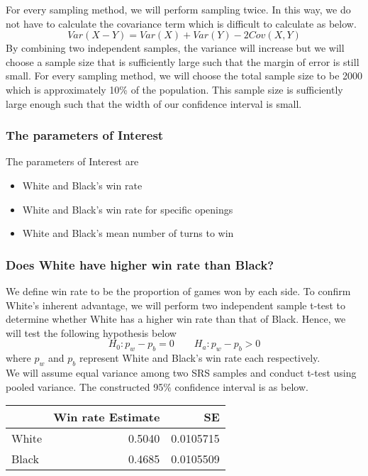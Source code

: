 \documentclass[11pt,]{article}
\begin{document}
\pagebreak

For every sampling method, we will perform sampling twice. In this way,
we do not have to calculate the covariance term which is difficult to
calculate as below. \[Var(X-Y) = Var(X)+Var(Y)-2Cov(X,Y)\] By combining
two independent samples, the variance will increase but we will choose a
sample size that is sufficiently large such that the margin of error is
still small. For every sampling method, we will choose the total sample
size to be 2000 which is approximately 10\% of the population. This
sample size is sufficiently large enough such that the width of our
confidence interval is small.

\hypertarget{the-parameters-of-interest}{%
\subsubsection{The parameters of
Interest}\label{the-parameters-of-interest}}

The parameters of Interest are

\begin{itemize}
\item White and Black's win rate
\item White and Black's win rate for specific openings
\item White and Black's mean number of turns to win
\end{itemize}

\hypertarget{does-white-have-higher-win-rate-than-black}{%
\subsubsection{Does White have higher win rate than
Black?}\label{does-white-have-higher-win-rate-than-black}}

We define win rate to be the proportion of games won by each side. To
confirm White's inherent advantage, we will perform two independent
sample t-test to determine whether White has a higher win rate than that
of Black. Hence, we will test the following hypothesis below
\[H_0 : p_w - p_b = 0 \quad  \quad H_a : p_w - p_b > 0\] where \(p_w\)
and \(p_b\) represent White and Black's win rate each respectively.\\
\newline We will assume equal variance among two SRS samples and conduct
t-test using pooled variance. The constructed 95\% confidence interval
is as below.

\begin{tabular}{l|r|r}
\hline
  & Win rate Estimate & SE\\
\hline
White & 0.5040 & 0.0105715\\
\hline
Black & 0.4685 & 0.0105509\\
\hline
\end{tabular}
\end{document}
